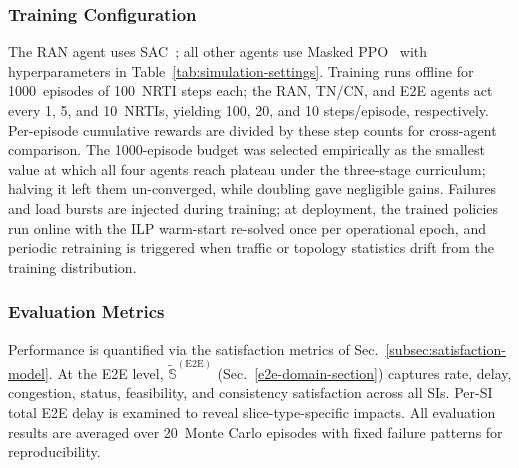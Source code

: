 \documentclass[12pt,lettersize,journal,onecolumn]{IEEEtran}
\begin{document}
\subsubsection{Training Configuration}
The RAN agent uses SAC~\cite{camad24ebrahimi}; all other agents use Masked PPO~\cite{prep17schulman} with hyperparameters in Table~\ref{tab:simulation-settings}. Training runs offline for 1000~episodes of 100~NRTI steps each; the RAN, TN/CN, and E2E agents act every 1, 5, and 10~NRTIs, yielding 100, 20, and 10 steps/episode, respectively. Per-episode cumulative rewards are divided by these step counts for cross-agent comparison. The 1000-episode budget was selected empirically as the smallest value at which all four agents reach plateau under the three-stage curriculum; halving it left them un-converged, while doubling gave negligible gains. Failures and load bursts are injected during training; at deployment, the trained policies run online with the ILP warm-start re-solved once per operational epoch, and periodic retraining is triggered when traffic or topology statistics drift from the training distribution.
 
\subsubsection{Evaluation Metrics}
Performance is quantified via the satisfaction metrics of Sec.~\ref{subsec:satisfaction-model}. %
At the E2E level, $\tilde{\mathbb{S}}^{\mathrm{(E2E)}}$ (Sec.~\ref{e2e-domain-section}) captures rate, delay, congestion, status, feasibility, and consistency satisfaction across all SIs. Per-SI total E2E delay is examined to reveal slice-type-specific impacts. All evaluation results are averaged over 20~Monte Carlo episodes with fixed failure patterns for reproducibility.

\end{document}

